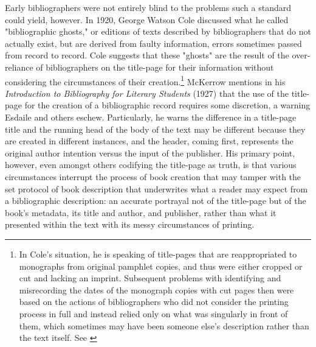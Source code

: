 Early bibliographers were not entirely blind to the problems such a standard could yield, however. In 1920, George Watson Cole discussed what he called "bibliographic ghosts," or editions of texts described by bibliographers that do not actually exist, but are derived from faulty information, errors sometimes passed from record to record. Cole suggests that these "ghosts" are the result of the over-reliance of bibliographers on the title-page for their information without considering the circumstances of their creation.\footnote{In Cole's situation, he is speaking of title-pages that are reappropriated to monographs from original pamphlet copies, and thus were either cropped or cut and lacking an imprint. Subsequent problems with identifying and misrecording the dates of the monograph copies with cut pages then were based on the actions of bibliographers who did not consider the printing process in full and instead relied only on what was singularly in front of them, which sometimes may have been someone else's description rather than the text itself. See \autocite[106-8]{cole_bibliographical_1920}} McKerrow mentions in his \textit{Introduction to Bibliography for Literary Students} (1927) that the use of the title-page for the creation of a bibliographic record requires some discretion, a warning Esdaile and others eschew. Particularly, he warns the difference in a title-page title and the running head of the body of the text may be different because they are created in different instances, and the header, coming first, represents the original author intention versus the input of the publisher. His primary point, however, even amongst others codifying the title-page as truth, is that various circumstances interrupt the process of book creation that may tamper with the set protocol of book description that underwrites what a reader may expect from a bibliographic description: an accurate portrayal not of the title-page but of the book's metadata, its title and author, and publisher, rather than what it presented within the text with its messy circumstances of printing.

